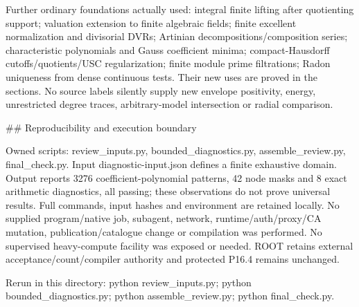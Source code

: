 \documentclass[11pt]{article}
\begin{document}
\begin{ReviewBody}
Further ordinary foundations actually used: integral finite lifting after quotienting support; valuation extension to finite algebraic fields; finite excellent normalization and divisorial DVRs; Artinian decompositions/composition series; characteristic polynomials and Gauss coefficient minima; compact-Hausdorff cutoffs/quotients/USC regularization; finite module prime filtrations; Radon uniqueness from dense continuous tests. Their new uses are proved in the sections. No source labels silently supply new envelope positivity, energy, unrestricted degree traces, arbitrary-model intersection or radial comparison.

## Reproducibility and execution boundary

Owned scripts: review_inputs.py, bounded_diagnostics.py, assemble_review.py, final_check.py. Input diagnostic-input.json defines a finite exhaustive domain. Output reports 3276 coefficient-polynomial patterns, 42 node masks and 8 exact arithmetic diagnostics, all passing; these observations do not prove universal results. Full commands, input hashes and environment are retained locally. No supplied program/native job, subagent, network, runtime/auth/proxy/CA mutation, publication/catalogue change or compilation was performed. No supervised heavy-compute facility was exposed or needed. ROOT retains external acceptance/count/compiler authority and protected P16.4 remains unchanged.

Rerun in this directory: python review_inputs.py; python bounded_diagnostics.py; python assemble_review.py; python final_check.py.
\end{ReviewBody}
\end{document}
